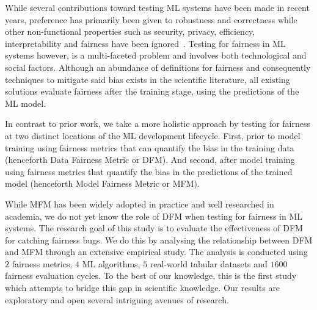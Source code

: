 \documentclass[sigconf]{acmart}
\begin{document}
While several contributions toward testing ML systems have been made
in recent years, preference has primarily been given to robustness and
correctness while other non-functional properties such as security,
privacy, efficiency, interpretability and fairness have been
ignored \cite{zhang2020machine,zhang2021ignorance,mehrabi2021survey,wan2021modeling}.
Testing for fairness in ML systems however, is a multi-faceted problem
and involves both technological and social factors. Although an
abundance of definitions for fairness and consequently techniques to
mitigate said bias exists in the scientific literature, all existing
solutions evaluate fairness after the training stage, using the
predictions of the ML model.

In contrast to prior work, we take a more holistic approach by testing
for fairness at two distinct locations of the ML development
lifecycle. First, prior to model training using fairness metrics that
can quantify the bias in the training data (henceforth Data Fairness
Metric or DFM). And second, after model training using fairness
metrics that quantify the bias in the predictions of the trained model
(henceforth Model Fairness Metric or MFM).

While MFM has been widely adopted in practice and well researched in
academia, we do not yet know the role of DFM when testing for fairness
in ML systems. The research goal of this study is to evaluate the
effectiveness of DFM for catching fairness bugs. We do this by
analysing the relationship between DFM and MFM through an extensive
empirical study. The analysis is conducted using $2$ fairness metrics,
$4$ ML algorithms, $5$ real-world tabular datasets and $1600$ fairness
evaluation cycles. To the best of our knowledge, this is the first
study which attempts to bridge this gap in scientific knowledge. Our
results are exploratory and open several intriguing avenues of
research.
\end{document}
